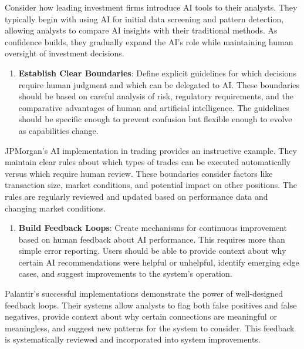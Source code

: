 \documentclass[
  Letterpaper,
]{scrbook}
\providecommand{\tightlist}{%
  \setlength{\itemsep}{0pt}\setlength{\parskip}{0pt}}\usepackage{longtable,booktabs,array}
\begin{document}
Consider how leading investment firms introduce AI tools to their
analysts. They typically begin with using AI for initial data screening
and pattern detection, allowing analysts to compare AI insights with
their traditional methods. As confidence builds, they gradually expand
the AI's role while maintaining human oversight of investment decisions.

\begin{enumerate}
\def\labelenumi{\arabic{enumi}.}
\setcounter{enumi}{3}
\tightlist
\item
  \textbf{Establish Clear Boundaries}: Define explicit guidelines for
  which decisions require human judgment and which can be delegated to
  AI. These boundaries should be based on careful analysis of risk,
  regulatory requirements, and the comparative advantages of human and
  artificial intelligence. The guidelines should be specific enough to
  prevent confusion but flexible enough to evolve as capabilities
  change.
\end{enumerate}

JPMorgan's AI implementation in trading provides an instructive example.
They maintain clear rules about which types of trades can be executed
automatically versus which require human review. These boundaries
consider factors like transaction size, market conditions, and potential
impact on other positions. The rules are regularly reviewed and updated
based on performance data and changing market conditions.

\begin{enumerate}
\def\labelenumi{\arabic{enumi}.}
\setcounter{enumi}{4}
\tightlist
\item
  \textbf{Build Feedback Loops}: Create mechanisms for continuous
  improvement based on human feedback about AI performance. This
  requires more than simple error reporting. Users should be able to
  provide context about why certain AI recommendations were helpful or
  unhelpful, identify emerging edge cases, and suggest improvements to
  the system's operation.
\end{enumerate}

Palantir's successful implementations demonstrate the power of
well-designed feedback loops. Their systems allow analysts to flag both
false positives and false negatives, provide context about why certain
connections are meaningful or meaningless, and suggest new patterns for
the system to consider. This feedback is systematically reviewed and
incorporated into system improvements.
\end{document}

